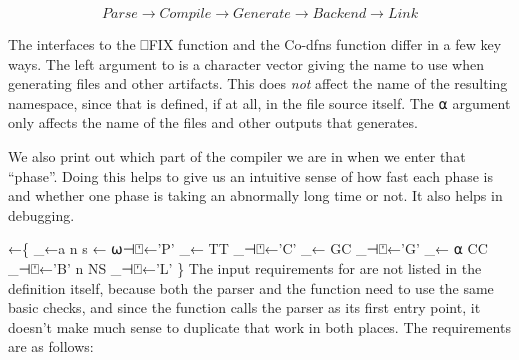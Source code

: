 \documentclass{article}%
\begin{document}
$$Parse → Compile → Generate → Backend → Link$$

\noindent
The interfaces to the {\Tt{}⎕FIX\nwendquote} function and the Co-dfns {\Tt{}\nwendquote}
function differ in a few key ways.
The left argument to {\Tt{}\nwendquote} is a character vector giving the name
to use when generating files and other artifacts.
This does \emph{not} affect the name of the resulting namespace,
since that is defined, if at all, in the file source itself.
The {\Tt{}⍺\nwendquote} argument only affects the name of the files and other
outputs that {\Tt{}\nwendquote} generates.

We also print out which part of the compiler we are in when we
enter that ``phase''. Doing this helps to give us an intuitive sense
of how fast each phase is and whether one phase is taking an
abnormally long time or not.
It also helps in debugging.

\nwenddocs{}\endmoddef\nwstartdeflinemarkup{}\nwenddeflinemarkup
{}←\{
        _←a n s ← ⍵⊣⍞←'P'
        _←          TT _⊣⍞←'C'
        _←          GC _⊣⍞←'G'
        _←        ⍺ CC _⊣⍞←'B'
                  n NS _⊣⍞←'L'
\}
\eatline
{}\nwendcode{}\nwdocspar
The input requirements for {\Tt{}\nwendquote} are not listed in the definition
itself, because both the parser {\Tt{}\nwendquote} and the {\Tt{}\nwendquote} function
need to use the same basic checks,
and since the {\Tt{}\nwendquote} function calls the parser
as its first entry point,
it doesn't make much sense to
duplicate that work in both places.
The requirements are as follows:
\end{document}
